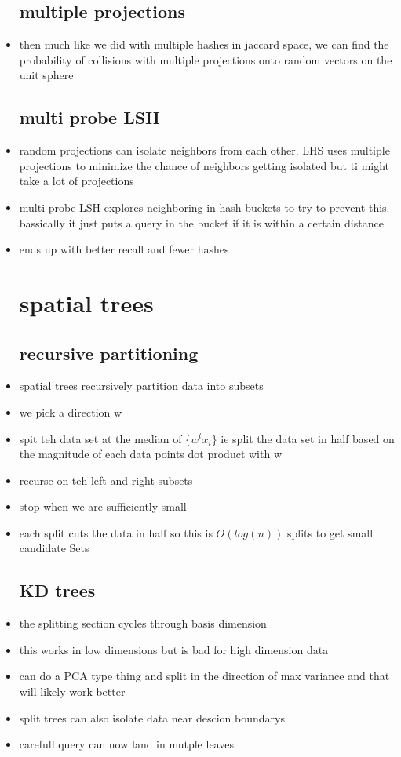 \documentclass{article}
\begin{document}
\begin{itemize}
\subsection*{multiple projections}
\item then much like we did with multiple hashes in jaccard space, we can find the probability of collisions with multiple projections onto random vectors on the unit sphere 
\subsection*{multi probe LSH}
\item random projections can isolate neighbors from each other. LHS uses multiple projections to minimize the chance of neighbors getting isolated but ti might take a lot of projections
\item multi probe LSH explores neighboring in hash buckets to try to prevent this. bassically it just puts a query in the bucket if it is within a certain distance
\item ends up with better recall and fewer hashes 
\section*{spatial trees}
\subsection*{recursive partitioning}
\item spatial trees recursively partition data into subsets
\item we pick a direction w 
\item spit teh data set at the median of $\{w^tx_i\}$ ie split the data set in half based on the magnitude of each data points dot product with w 
\item recurse on teh left and right subsets
\item stop when we are sufficiently small
\item each split cuts the data in half so this is $O(log(n))$ splits to get small candidate Sets 
\subsection*{KD trees}
\item the splitting section cycles through basis dimension 
\item this works in low dimensions but is bad for high dimension data
\item can do a PCA type thing and split in the direction of max variance and that will likely work better 
\item split trees can also isolate data near descion boundarys 
\item carefull query can now land in mutple leaves 



\end{itemize}
\end{document}
